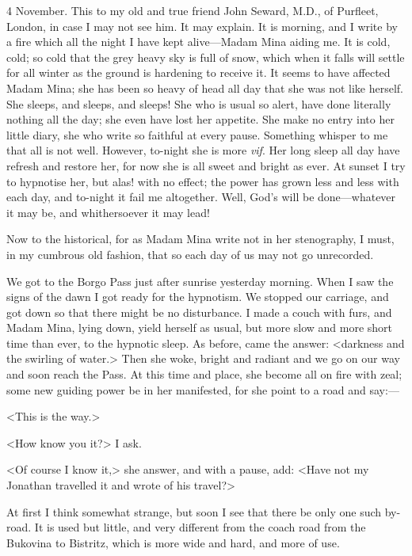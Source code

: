 \begin{diary}{4 November.}
This to my old and true friend John Seward, M\@.D\@., of Purfleet, London, in case I may not see him. It may explain. It is morning, and I write by a fire which all the night I have kept alive—Madam Mina aiding me. It is cold, cold; so cold that the grey heavy sky is full of snow, which when it falls will settle for all winter as the ground is hardening to receive it. It seems to have affected Madam Mina; she has been so heavy of head all day that she was not like herself. She sleeps, and sleeps, and sleeps! She who is usual so alert, have done literally nothing all the day; she even have lost her appetite. She make no entry into her little diary, she who write so faithful at every pause. Something whisper to me that all is not well. However, to-night she is more \textit{vif}. Her long sleep all day have refresh and restore her, for now she is all sweet and bright as ever. At sunset I try to hypnotise her, but alas! with no effect; the power has grown less and less with each day, and to-night it fail me altogether. Well, God's will be done—whatever it may be, and whithersoever it may lead!

Now to the historical, for as Madam Mina write not in her stenography, I must, in my cumbrous old fashion, that so each day of us may not go unrecorded.

We got to the Borgo Pass just after sunrise yesterday morning. When I saw the signs of the dawn I got ready for the hypnotism. We stopped our carriage, and got down so that there might be no disturbance. I made a couch with furs, and Madam Mina, lying down, yield herself as usual, but more slow and more short time than ever, to the hypnotic sleep. As before, came the answer: <darkness and the swirling of water.> Then she woke, bright and radiant and we go on our way and soon reach the Pass. At this time and place, she become all on fire with zeal; some new guiding power be in her manifested, for she point to a road and say:—

<This is the way.>

<How know you it?> I ask.

<Of course I know it,> she answer, and with a pause, add: <Have not my Jonathan travelled it and wrote of his travel?>

At first I think somewhat strange, but soon I see that there be only one such by-road. It is used but little, and very different from the coach road from the Bukovina to Bistritz, which is more wide and hard, and more of use.


\end{diary}
